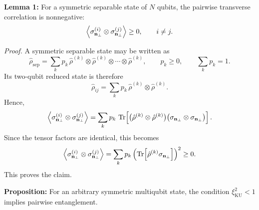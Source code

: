 \medskip

\noindent\textbf{Lemma 1:}  
For a symmetric separable state of \(N\) qubits, the pairwise transverse correlation is nonnegative:
\begin{equation}
	\expval{\sigma_{\mathbf{n}_\perp}^{(i)}\otimes \sigma_{\mathbf{n}_\perp}^{(j)}} \geq 0,
	\qquad
	i\neq j.
	\label{eq:intro_qm_lemma_negative_correlation}
\end{equation}

\noindent\textit{Proof.}  
A symmetric separable state may be written as
\begin{equation}
	\hat \rho_{\mathrm{sep}}
	=
	\sum_k p_k\, \hat \rho^{(k)}\otimes \hat \rho^{(k)}\otimes \cdots \otimes \hat \rho^{(k)},
	\qquad
	p_k\geq 0,
	\qquad
	\sum_k p_k=1.
	\label{eq:intro_qm_symmetric_separable_state_decomposition}
\end{equation}
Its two-qubit reduced state is therefore
\begin{equation}
	\hat \rho_{ij}
	=
	\sum_k p_k\, \hat \rho^{(k)}\otimes \hat \rho^{(k)}.
	\label{eq:intro_qm_two_qubit_reduction_symmetric_separable}
\end{equation}
Hence,
\begin{equation}
	\expval{\sigma_{\mathbf{n}_\perp}^{(i)}\otimes \sigma_{\mathbf{n}_\perp}^{(j)}}
	=
	\sum_k p_k\,
	\Tr\!\left[
	\bigl(\hat \rho^{(k)}\otimes \hat \rho^{(k)}\bigr)
	\bigl(\sigma_{\mathbf{n}_\perp}\otimes \sigma_{\mathbf{n}_\perp}\bigr)
	\right].
	\label{eq:intro_qm_pairwise_correlation_reduced_state}
\end{equation}
Since the tensor factors are identical, this becomes
\begin{equation}
	\expval{\sigma_{\mathbf{n}_\perp}^{(i)}\otimes \sigma_{\mathbf{n}_\perp}^{(j)}}
	=
	\sum_k p_k
	\left(
	\Tr\!\left[\hat \rho^{(k)}\sigma_{\mathbf{n}_\perp}\right]
	\right)^2
	\geq 0.
	\label{eq:intro_qm_pairwise_correlation_nonnegative_proof}
\end{equation}
This proves the claim.

\medskip

\noindent\textbf{Proposition:}  
For an arbitrary symmetric multiqubit state, the condition \(\xi_{\mathrm{KU}}^2<1\) implies pairwise entanglement.

